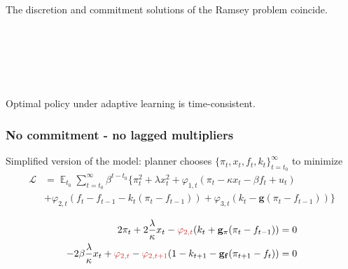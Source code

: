 \documentclass[10pt]{beamer}
\DeclareMathOperator{\E}{\mathbb{E}}
\begin{document}
\begin{frame}[plain]  %
	\frametitle{}
	\label{no_commitment}

\begin{lemma} The discretion and commitment solutions of the Ramsey problem coincide. 
\end{lemma}

\

\hfill \hyperlink{no_commitment_intuition}{}

\

\

\begin{corollary} Optimal policy under adaptive learning is time-consistent. 
\end{corollary}







\end{frame}

\begin{frame}[plain]  %
	\frametitle{No commitment - no lagged multipliers}
	\label{no_commitment_intuition}
	
	Simplified version of the model: planner chooses $\{\pi_t, x_t, f_t, k_t\}_{t=t_0}^{\infty}$ to minimize
 \begin{align*}
\mathcal{L} &= \E_{t_0}\sum_{t=t_0}^{\infty} \beta^{t-t_0}\bigg\{ \pi_t^2  + \lambda x_t^2 + \varphi_{1,t} (\pi_t -\kappa x_t- \beta f_t +u_t) \\ &+ \varphi_{2,t}(f_t - f_{t-1} -k_t(\pi_t - f_{t-1})) + \varphi_{3,t}(k_t- \mathbf{g}(\pi_t - f_{t-1})) \bigg\}
 \end{align*}

 \begin{align}
  2\pi_t +2\frac{\lambda}{\kappa}x_t -\textcolor{brownreddark}{\varphi_{2,t}}(k_t + \mathbf{g_{\pi}}(\pi_t -f_{t-1}))& = 0 \label{simpleFOC1} \\
  -2\beta\frac{\lambda}{\kappa}x_t + \textcolor{brownreddark}{\varphi_{2,t}} -\textcolor{brownreddark}{\varphi_{2,t+1}}(1-k_{t+1} -\mathbf{g_{f}}(\pi_{t+1} -f_{t})) & = 0 \label{simpleFOC2} 
 \end{align}

  
\hyperlink{no_commitment}{}	


\end{frame}
\end{document}
